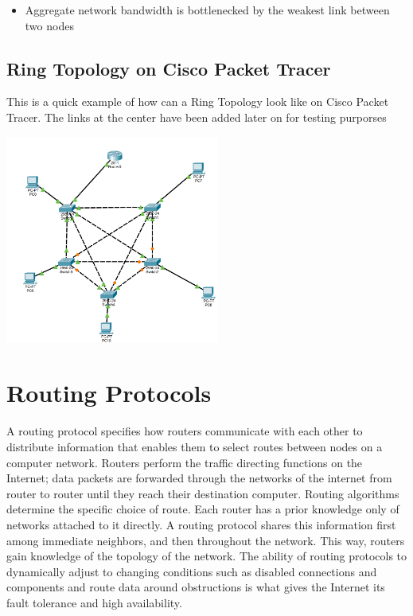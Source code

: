 \documentclass[a4paper,12pt]{article}
\begin{document}
\begin{itemize}
\item {Aggregate network bandwidth is bottlenecked by the weakest link between two nodes}
\end{itemize}

\clearpage
\subsection{Ring Topology on Cisco Packet Tracer}

This is a quick example of how can a Ring Topology look like on Cisco Packet Tracer. The links at the center have been added later on for testing purporses

\noindent \includegraphics[width=7cm]{./star-topology/screenshot.PNG} \newline

\section{Routing Protocols}

A routing protocol specifies how routers communicate with each other to distribute information that enables them to select routes between nodes on a computer network. Routers perform the traffic directing functions on the Internet; data packets are forwarded through the networks of the internet from router to router until they reach their destination computer. Routing algorithms determine the specific choice of route. Each router has a prior knowledge only of networks attached to it directly. A routing protocol shares this information first among immediate neighbors, and then throughout the network. This way, routers gain knowledge of the topology of the network. The ability of routing protocols to dynamically adjust to changing conditions such as disabled connections and components and route data around obstructions is what gives the Internet its fault tolerance and high availability. \newline
\end{document}
